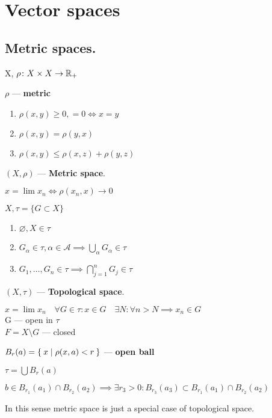 \section{Vector spaces}
\subsection{Metric spaces.}

X, $\rho\colon X \times X \to \mathbb{R}_+$
\begin{defn}$\rho$ --- \textbf{metric}
  \begin{enumerate}
    \item $\rho(x, y) \geq 0, = 0 \iff x = y$
    \item $\rho(x, y) = \rho (y, x)$
    \item $\rho(x, y) \leq \rho (x, z) + \rho (y, z)$
  \end{enumerate}
\end{defn}
\begin{defn}$(X, \rho)$ --- \textbf{Metric space}.\end{defn}
\begin{defn}$x = \lim x_{n} \iff \rho(x_{n}, x) \to 0$\end{defn}
\vspace{5mm}
$X, \tau = \{G \subset X\}$
\begin{enumerate}
  \item $\varnothing, X \in \tau$
  \item $G_\alpha \in \tau, \alpha \in \mathscr{A} \implies \bigcup\limits_\alpha G_\alpha \in \tau$
  \item $G_1, \dotsc, G_n \in \tau \implies \bigcap\limits_{j = 1}^n G_j \in \tau$
\end{enumerate}
\begin{defn}$(X, \tau)$ --- \textbf{Topological space}.\end{defn}
$x = \lim x_n \quad \forall G \in \tau: x \in G \quad \exists N: \forall n > N \implies x_n \in G$\\
G --- open in $\tau$ \\
$F = X \setminus G$ --- closed
\begin{defn}
  $B_r (a) = \Set{x | \rho(x, a) < r}$ --- \textbf{open ball}
\end{defn}
\noindent
$\tau = \bigcup B_r (a)$
\begin{stm}
  $b \in B_{r_1} (a_1) \cap B_{r_2} (a_2) \implies \exists r_3 > 0: B_{r_3}
  (a_3) \subset B_{r_1} (a_1) \cap B_{r_2} (a_2)$
\end{stm}
\noindent
In this sense metric space is just a special case of topological space.
